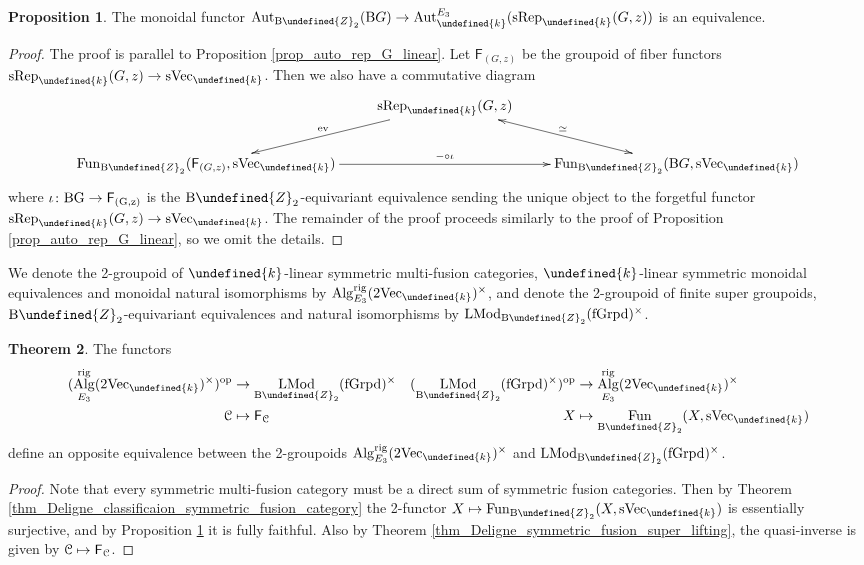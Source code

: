\documentclass[10pt]{article}
\let\mathbb\undefined
\theoremstyle{definition}
\newtheorem{thm}{Theorem}[section]
\newtheorem{prop}[thm]{Proposition}
\numberwithin{equation}{section}
\numberwithin{thm}{section}
\newcommand{\pf}{\begin{proof}}
\newcommand{\epf}{\end{proof}}
\newcommand{\Zb}{\mathbb{Z}}
\newcommand{\bk}{\mathbb{k}}
\newcommand{\CC}{\EuScript{C}}
\newcommand{\SF}{\mathsf{F}}
\newcommand{\rmB}{\mathrm{B}}
\DeclareMathOperator{\Aut}{Aut}
\DeclareMathOperator{\ev}{ev}
\DeclareMathOperator{\fun}{Fun}
\DeclareMathOperator{\Alg}{Alg}
\DeclareMathOperator{\LMod}{LMod}
\newcommand{\op}{\mathrm{op}}
\newcommand{\vect}{\mathrm{Vec}}
\newcommand{\svect}{\mathrm{sVec}}
\newcommand{\srep}{\mathrm{sRep}}
\newcommand{\rig}{\mathrm{rig}}
\begin{document}
\begin{prop} \label{prop_auto_srep_G_z_linear}
The monoidal functor $\Aut_{\rmB \Zb_2}(\rmB G) \to \Aut_\bk^{E_3}(\srep_\bk(G,z))$ is an equivalence.
\end{prop}

\pf
The proof is parallel to Proposition \ref{prop_auto_rep_G_linear}. Let $\SF_{(G,z)}$ be the groupoid of fiber functors $\srep_\bk(G,z) \to \svect_\bk$. Then we also have a commutative diagram
\[
\xymatrix{
 & \srep_\bk(G,z) \ar[dl]_{\ev} \ar@{<->}[dr]^{\simeq} \\
\fun_{\rmB \Zb_2}(\SF_{(G,z)},\svect_\bk) \ar[rr]^-{- \circ \iota} & & \fun_{\rmB \Zb_2}(\rmB G,\svect_\bk)
}
\]
where $\iota \colon \rm B G \to \SF_{(G,z)}$ is the $\rmB \Zb_2$-equivariant equivalence sending the unique object to the forgetful functor $\srep_\bk(G,z) \to \svect_\bk$. The remainder of the proof proceeds similarly to the proof of Proposition \ref{prop_auto_rep_G_linear}, so we omit the details.
\epf

We denote the 2-groupoid of $\bk$-linear symmetric multi-fusion categories, $\bk$-linear symmetric monoidal equivalences and monoidal natural isomorphisms by $\Alg_{E_3}^\rig(2\vect_\bk)^\times$, and denote the 2-groupoid of finite super groupoids, $\rmB \Zb_2$-equivariant equivalences and natural isomorphisms by $\LMod_{\rmB \Zb_2}(\mathrm{fGrpd})^\times$.

\begin{thm} \label{thm_symmetric_fusion_category_C_super_groupoid}
The functors
\begin{align*}
(\Alg_{E_3}^\rig(2\vect_\bk)^\times)^\op & \to \LMod_{\rmB \Zb_2}(\mathrm{fGrpd})^\times & (\LMod_{\rmB \Zb_2}(\mathrm{fGrpd})^\times)^\op & \to \Alg_{E_3}^\rig(2\vect_\bk)^\times \\
\CC & \mapsto \SF_\CC & X & \mapsto \fun_{\rmB \Zb_2}(X,\svect_\bk)
\end{align*}
define an opposite equivalence between the 2-groupoids $\Alg_{E_3}^\rig(2\vect_\bk)^\times$ and $\LMod_{\rmB \Zb_2}(\mathrm{fGrpd})^\times$.
\end{thm}

\pf
Note that every symmetric multi-fusion category must be a direct sum of symmetric fusion categories. Then by Theorem \ref{thm_Deligne_classificaion_symmetric_fusion_category} the 2-functor $X \mapsto \fun_{\rmB \Zb_2}(X,\svect_\bk)$ is essentially surjective, and by Proposition \ref{prop_auto_srep_G_z_linear} it is fully faithful. Also by Theorem \ref{thm_Deligne_symmetric_fusion_super_lifting}, the quasi-inverse is given by $\CC \mapsto \SF_\CC$.
\epf
\end{document}
